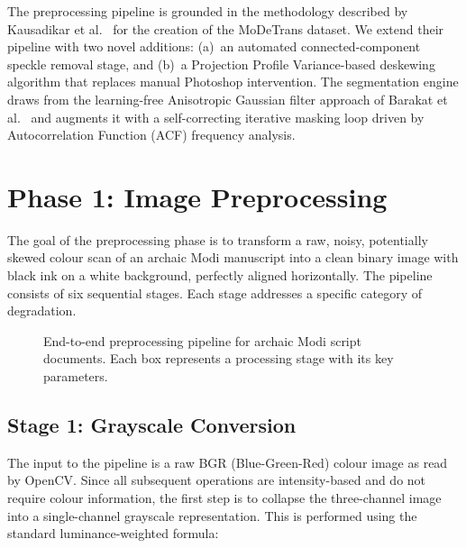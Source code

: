 \documentclass[12pt, a4paper]{article}
\begin{document}
The preprocessing pipeline is grounded in the methodology described by Kausadikar et al.~\cite{kausadikar2025} for the creation of the MoDeTrans dataset. We extend their pipeline with two novel additions: (a)~an automated connected-component speckle removal stage, and (b)~a Projection Profile Variance-based deskewing algorithm that replaces manual Photoshop intervention. The segmentation engine draws from the learning-free Anisotropic Gaussian filter approach of Barakat et al.~\cite{barakat2020} and augments it with a self-correcting iterative masking loop driven by Autocorrelation Function (ACF) frequency analysis.


\section{Phase 1: Image Preprocessing}

The goal of the preprocessing phase is to transform a raw, noisy, potentially skewed colour scan of an archaic Modi manuscript into a clean binary image with black ink on a white background, perfectly aligned horizontally. The pipeline consists of six sequential stages. Each stage addresses a specific category of degradation.

\begin{figure}[H]
    \centering
    \caption{End-to-end preprocessing pipeline for archaic Modi script documents. Each box represents a processing stage with its key parameters.}
    \label{fig:preprocess_pipeline}
\end{figure}


\subsection{Stage 1: Grayscale Conversion}

The input to the pipeline is a raw BGR (Blue-Green-Red) colour image as read by OpenCV. Since all subsequent operations are intensity-based and do not require colour information, the first step is to collapse the three-channel image into a single-channel grayscale representation. This is performed using the standard luminance-weighted formula:
\end{document}
